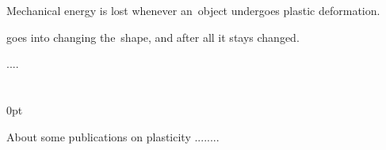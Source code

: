 \label{section:energygoesthere}

Mechanical energy is lost whenever an~object undergoes plastic deformation.

goes
into
changing
the~shape,
and after all
it
stays
changed.

....



\section*{\small \wordforbibliography}

\begin{changemargin}{\parindent}{0pt}
\fontsize{10}{12}\selectfont

About some publications on plasticity ........

\end{changemargin}
